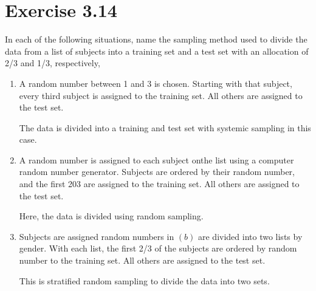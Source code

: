 \documentclass{article}
\begin{document}
\begin{minipage}{6in}
\section*{Exercise 3.14}
In each of the following situations, name the sampling method used to divide the data from a list of subjects into a training set and a test set with an allocation of 2/3 and 1/3, respectively,
\begin{enumerate}[\hspace{.5em}a)]
	\item A random number between 1 and 3 is chosen. Starting with that subject, every third subject is assigned to the training set. All others are assigned to the test set.
	
	\hspace{2em} The data is divided into a training and test set with systemic sampling in this case.
	\item A random number is assigned to each subject onthe list using a computer random number generator. Subjects are ordered by their random number, and the first 203 are assigned to the training set. All others are assigned to the test set.
	
	\hspace{2em} Here, the data is divided using random sampling.
	\item Subjects are assigned random numbers in $(b)$ are divided into two lists by gender. With each list, the first 2/3 of the subjects are ordered by random number to the training set. All others are assigned to the test set.
	
	\hspace{2em} This is stratified random sampling to divide the data into two sets.
\end{enumerate}
\end{minipage}
\end{document}

